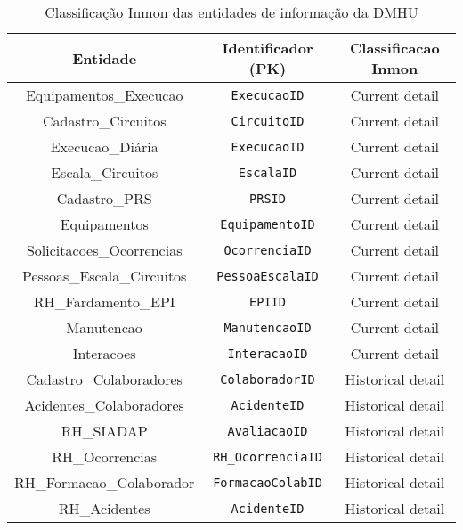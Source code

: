 \documentclass[12pt,a4paper,final]{article}
\begin{document}
    \begin{table}[]
        \centering
        \caption{Classificação Inmon das entidades de informação da DMHU}
        \label{tab:inmon}
        \begin{tabular}{@{}|c|c|c|@{}}
            \toprule
            \textbf{Entidade} & \textbf{Identificador (PK)} & \textbf{Classificacao Inmon}\\\midrule
            Equipamentos\_Execucao          & \texttt{ExecucaoID}         & Current detail\\
            Cadastro\_Circuitos             & \texttt{CircuitoID}         & Current detail\\
            Execucao\_Diária                & \texttt{ExecucaoID}         & Current detail\\
            Escala\_Circuitos               & \texttt{EscalaID}           & Current detail\\
            Cadastro\_PRS                   & \texttt{PRSID}             & Current detail\\
            Equipamentos                    & \texttt{EquipamentoID}      & Current detail\\
            Solicitacoes\_Ocorrencias       & \texttt{OcorrenciaID}       & Current detail\\
            Pessoas\_Escala\_Circuitos      & \texttt{PessoaEscalaID}     & Current detail\\
            RH\_Fardamento\_EPI             & \texttt{EPIID}              & Current detail\\
            Manutencao                      & \texttt{ManutencaoID}       & Current detail\\
            Interacoes                      & \texttt{InteracaoID}        & Current detail\\
            Cadastro\_Colaboradores         & \texttt{ColaboradorID}      & Historical detail\\
            Acidentes\_Colaboradores        & \texttt{AcidenteID}         & Historical detail\\
            RH\_SIADAP                       & \texttt{AvaliacaoID}        & Historical detail\\
            RH\_Ocorrencias                 & \texttt{RH\_OcorrenciaID}   & Historical detail\\
            RH\_Formacao\_Colaborador       & \texttt{FormacaoColabID}    & Historical detail\\
            RH\_Acidentes                   & \texttt{AcidenteID}          & Historical detail\\

\end{tabular}
\end{table}
\end{document}
